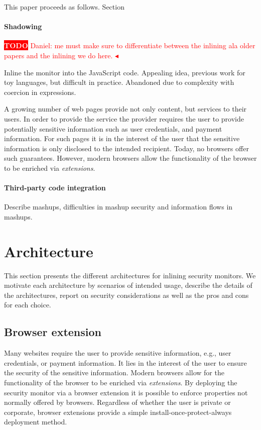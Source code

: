 \documentclass{llncs}
\newcommand{\todo}[1]{\colorbox{red}{\textcolor{white}{\sffamily\bfseries\scriptsize TODO}} \textcolor{red}{#1} \textcolor{red}{$\blacktriangleleft$}}
\begin{document}
This paper proceeds as follows. Section~



\paragraph{Shadowing}
\todo{Daniel: me must make sure to differentiate between the inlining ala older papers and the inlining we do here.}

Inline the monitor into the JavaScript code. Appealing idea, previous work for 
toy languages, but difficult in practice. Abandoned due to complexity with 
coercion in expressions.


A growing number of web pages provide not only content, but services to their
users. In order to provide the service the provider requires the user to
provide potentially sensitive information such as user credentials, and payment
information. For such pages it is in the interest of the user that the
sensitive information is only disclosed to the intended recipient.  Today, no
browsers offer such guarantees. However, modern browsers allow the
functionality of the browser to be enriched via \emph{extensions}. 


\paragraph{Third-party code integration}

Describe mashups, difficulties in mashup security and information flows in mashups.

\section{Architecture}
\label{sec:arch}

This section presents the different architectures for inlining
security monitors. We motivate each architecture by scenarios of
intended usage, describe the details of the architectures, report on
security considerations as well as the pros and cons for each choice.




\subsection{Browser extension}

Many websites require the user to provide sensitive information, e.g., user
credentials, or payment information. It lies in the interest of the user to
ensure the security of the sensitive information.  Modern browsers allow for
the functionality of the browser to be enriched via \emph{extensions}. By
deploying the security monitor via a browser extension it is possible to enforce
properties not normally offered by browsers.  Regardless of whether the user is
private or corporate, browser extensions provide a simple 
install-once-protect-always deployment method.
\end{document}
